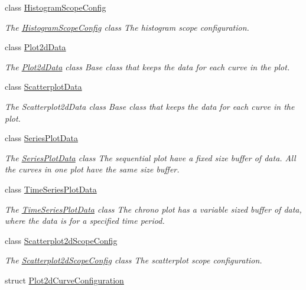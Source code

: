 \begin{DoxyCompactItemize}
class \hyperlink{class_histogram_scope_config}{\-Histogram\-Scope\-Config}
\begin{DoxyCompactList}\small\item\em \-The \hyperlink{class_histogram_scope_config}{\-Histogram\-Scope\-Config} class \-The histogram scope configuration. \end{DoxyCompactList}\item 
class \hyperlink{class_plot2d_data}{\-Plot2d\-Data}
\begin{DoxyCompactList}\small\item\em \-The \hyperlink{class_plot2d_data}{\-Plot2d\-Data} class \-Base class that keeps the data for each curve in the plot. \end{DoxyCompactList}\item 
class \hyperlink{class_scatterplot_data}{\-Scatterplot\-Data}
\begin{DoxyCompactList}\small\item\em \-The \-Scatterplot2d\-Data class \-Base class that keeps the data for each curve in the plot. \end{DoxyCompactList}\item 
class \hyperlink{class_series_plot_data}{\-Series\-Plot\-Data}
\begin{DoxyCompactList}\small\item\em \-The \hyperlink{class_series_plot_data}{\-Series\-Plot\-Data} class \-The sequential plot have a fixed size buffer of data. \-All the curves in one plot have the same size buffer. \end{DoxyCompactList}\item 
class \hyperlink{class_time_series_plot_data}{\-Time\-Series\-Plot\-Data}
\begin{DoxyCompactList}\small\item\em \-The \hyperlink{class_time_series_plot_data}{\-Time\-Series\-Plot\-Data} class \-The chrono plot has a variable sized buffer of data, where the data is for a specified time period. \end{DoxyCompactList}\item 
class \hyperlink{class_scatterplot2d_scope_config}{\-Scatterplot2d\-Scope\-Config}
\begin{DoxyCompactList}\small\item\em \-The \hyperlink{class_scatterplot2d_scope_config}{\-Scatterplot2d\-Scope\-Config} class \-The scatterplot scope configuration. \end{DoxyCompactList}\item 
struct \hyperlink{struct_plot2d_curve_configuration}{\-Plot2d\-Curve\-Configuration}

\end{DoxyCompactItemize}
